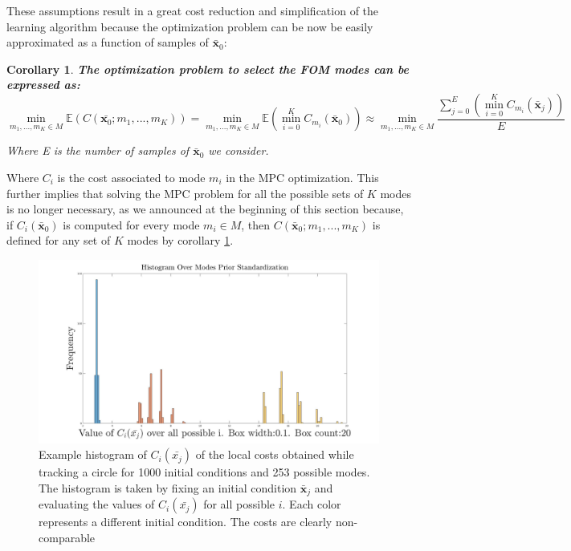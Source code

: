 \documentclass[12,twoside]{TFG-GM}
\newtheorem{corollary}[theorem]{Corollary}
\theoremstyle{definition}
\theoremstyle{remark}
\newcommand*\diff[1]{\bar{#1}}
\begin{document}
These assumptions result in a great cost reduction and simplification of the learning algorithm because the optimization problem can be now be easily approximated as a function of samples of $\diff{\textbf{x}}_0$:
\begin{corollary} \textbf{The optimization problem to select the FOM modes can be expressed as:} \label{cor:costfunction} 
 $$\min\limits_{m_1, ..., m_K \in M}\mathbb{E}(C(\diff{\textbf{x}_0}; m_1, ..., m_K)) = \min\limits_{m_1, ..., m_K \in M}\mathbb{E}(\min\limits_{i = 0}^{K}{C_{m_i}(\diff{\textbf{x}}_0)}) \approx \min\limits_{m_1, ..., m_K \in M} \dfrac{\sum\limits_{j = 0}^{E}(\min\limits_{i = 0}^{K}{C_{m_i}(\diff{\textbf{x}}_j)})}{E}$$

Where E is the number of samples of $\diff{\textbf{x}}_0$ we consider.
\end{corollary}
Where $C_i$ is the cost associated to mode $m_i$ in the MPC optimization. This further implies that solving the MPC problem for all the possible sets of $K$ modes is no longer necessary, as we announced at the beginning of this section because, if $C_i(\diff{\textbf{x}}_0)$ is computed for every mode $m_i \in M$, then $C(\diff{\textbf{x}}_0; m_1, ..., m_K)$ is defined for any set of $K$ modes by corollary \ref{cor:costfunction}.


\begin{figure}[htb!]
\begin{center}
\includegraphics[width=16cm]{hist_pre_std.jpg}
\end{center}
\caption{\label{fig:hist_pre} \small Example histogram of $C_i(\diff{x_j})$ of the local costs obtained while tracking a circle for 1000 initial conditions and 253 possible modes. The histogram is taken by fixing an initial condition $\diff{\textbf{x}}_j$ and evaluating the values of $C_i(\diff{x_j})$ for all possible $i$. Each color represents a different initial condition. The costs are clearly non-comparable}
\end{figure}
\end{document}
